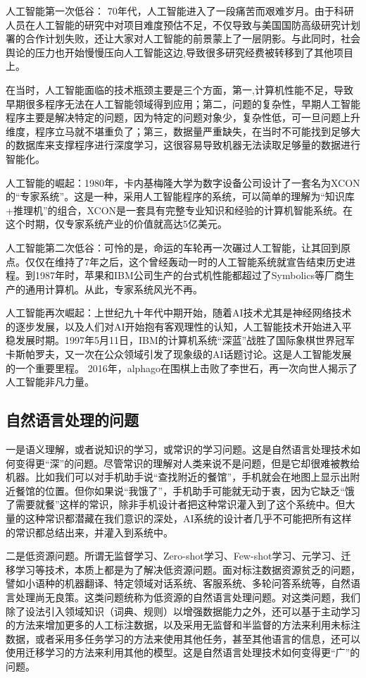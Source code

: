 \documentclass{article}
\begin{document}
人工智能第一次低谷： 70年代，人工智能进入了一段痛苦而艰难岁月。由于科研人员在人工智能的研究中对项目难度预估不足，不仅导致与美国国防高级研究计划署的合作计划失败，还让大家对人工智能的前景蒙上了一层阴影。与此同时，社会舆论的压力也开始慢慢压向人工智能这边,导致很多研究经费被转移到了其他项目上。\par 
在当时，人工智能面临的技术瓶颈主要是三个方面，第一,计算机性能不足，导致早期很多程序无法在人工智能领域得到应用；第二，问题的复杂性，早期人工智能程序主要是解决特定的问题，因为特定的问题对象少，复杂性低，可一旦问题上升维度，程序立马就不堪重负了；第三，数据量严重缺失，在当时不可能找到足够大的数据库来支撑程序进行深度学习，这很容易导致机器无法读取足够量的数据进行智能化。  \par 
人工智能的崛起：1980年，卡内基梅隆大学为数字设备公司设计了一套名为XCON的“专家系统”。这是一种，采用人工智能程序的系统，可以简单的理解为“知识库+推理机”的组合，XCON是一套具有完整专业知识和经验的计算机智能系统。在这个时期，仅专家系统产业的价值就高达5亿美元。 \par 
人工智能第二次低谷：可怜的是，命运的车轮再一次碾过人工智能，让其回到原点。仅仅在维持了7年之后，这个曾经轰动一时的人工智能系统就宣告结束历史进程。到1987年时，苹果和IBM公司生产的台式机性能都超过了Symbolics等厂商生产的通用计算机。从此，专家系统风光不再。 \par 
人工智能再次崛起：上世纪九十年代中期开始，随着AI技术尤其是神经网络技术的逐步发展，以及人们对AI开始抱有客观理性的认知，人工智能技术开始进入平稳发展时期。1997年5月11日，IBM的计算机系统“深蓝”战胜了国际象棋世界冠军卡斯帕罗夫，又一次在公众领域引发了现象级的AI话题讨论。这是人工智能发展的一个重要里程。 2016年，alphago在围棋上击败了李世石，再一次向世人揭示了人工智能非凡力量。
\subsection{自然语言处理的问题}
一是语义理解，或者说知识的学习，或常识的学习问题。这是自然语言处理技术如何变得更“深”的问题。尽管常识的理解对人类来说不是问题，但是它却很难被教给机器。比如我们可以对手机助手说“查找附近的餐馆”，手机就会在地图上显示出附近餐馆的位置。但你如果说“我饿了”，手机助手可能就无动于衷，因为它缺乏“饿了需要就餐”这样的常识，除非手机设计者把这种常识灌入到了这个系统中。但大量的这种常识都潜藏在我们意识的深处，AI系统的设计者几乎不可能把所有这样的常识都总结出来，并灌入到系统中。
\par 
二是低资源问题。所谓无监督学习、Zero-shot学习、Few-shot学习、元学习、迁移学习等技术，本质上都是为了解决低资源问题。面对标注数据资源贫乏的问题，譬如小语种的机器翻译、特定领域对话系统、客服系统、多轮问答系统等，自然语言处理尚无良策。这类问题统称为低资源的自然语言处理问题。对这类问题，我们除了设法引入领域知识（词典、规则）以增强数据能力之外，还可以基于主动学习的方法来增加更多的人工标注数据，以及采用无监督和半监督的方法来利用未标注数据，或者采用多任务学习的方法来使用其他任务，甚至其他语言的信息，还可以使用迁移学习的方法来利用其他的模型。这是自然语言处理技术如何变得更“广”的问题。
\end{document}
